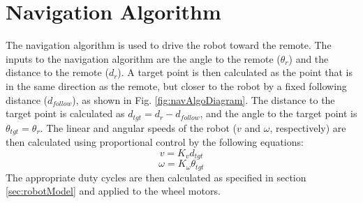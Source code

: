 \section{Navigation Algorithm}\label{sec:navAlgo}
The navigation algorithm is used to drive the robot toward the remote. The inputs to the navigation algorithm are the angle to the remote ($\theta_r$) and the distance to the remote ($d_r$). A target point is then calculated as the point that is in the same direction as the remote, but closer to the robot by a fixed following distance ($d_{follow}$), as shown in Fig. \ref{fig:navAlgoDiagram}. The distance to the target point is calculated as $d_{tgt} = d_r - d_{follow}$, and the angle to the target point is $\theta_{tgt} = \theta_r$. The linear and angular speeds of the robot ($v$ and $\omega$, respectively) are then calculated using proportional control by the following equations:
$$v = K_vd_{tgt}$$
$$\omega = K_\omega\theta_{tgt}$$
The appropriate duty cycles are then calculated as specified in section \ref{sec:robotModel} and applied to the wheel motors.

